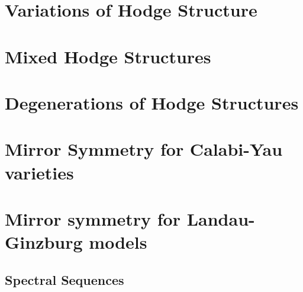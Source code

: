 \documentclass{article}
\numberwithin{equation}{section}
\begin{document}
\section{Variations of Hodge Structure}\label{sect:vhs}



\section{Mixed Hodge Structures}\label{sect:mhs}



\section{Degenerations of Hodge Structures}



\section{Mirror Symmetry for Calabi-Yau varieties}



\section{Mirror symmetry for Landau-Ginzburg models}



\newpage

\begin{appendices}

\section{Spectral Sequences}\label{SpSeq}







\end{appendices}
\end{document}
